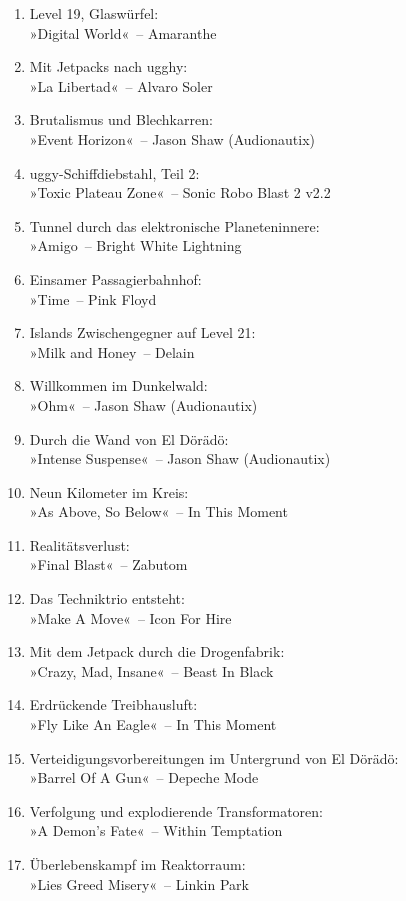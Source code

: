 \begin{enumerate}
    \item Level 19, Glaswürfel:\\ »Digital World«~– Amaranthe
    \item Mit Jetpacks nach ugghy:\\ »La Libertad«~– Alvaro Soler
    \item Brutalismus und Blechkarren:\\ »Event Horizon«~– Jason Shaw (Audionautix)
    \item uggy-Schiffdiebstahl, Teil 2:\\ »Toxic Plateau Zone«~– Sonic Robo Blast 2 v2.2
    \item Tunnel durch das elektronische Planeteninnere:\\ »Amigo~– Bright White Lightning
    \item Einsamer Passagierbahnhof:\\ »Time~– Pink Floyd
    \item Islands Zwischengegner auf Level 21:\\ »Milk and Honey~– Delain
    \item Willkommen im Dunkelwald:\\ »Ohm«~– Jason Shaw (Audionautix)
    \item Durch die Wand von El Dörädö:\\ »Intense Suspense«~– Jason Shaw (Audionautix)
    \item Neun Kilometer im Kreis:\\ »As Above, So Below«~– In This Moment
    \item Realitätsverlust:\\ »Final Blast«~– Zabutom
    \item Das Techniktrio entsteht:\\ »Make A Move«~– Icon For Hire
    \item Mit dem Jetpack durch die Drogenfabrik:\\ »Crazy, Mad, Insane«~– Beast In Black
    \item Erdrückende Treibhausluft:\\ »Fly Like An Eagle«~– In This Moment
    \item Verteidigungsvorbereitungen im Untergrund von El Dörädö:\\ »Barrel Of A Gun«~– Depeche Mode
    \item Verfolgung und explodierende Transformatoren:\\ »A Demon's Fate«~– Within Temptation
    \item Überlebenskampf im Reaktorraum:\\ »Lies Greed Misery«~– Linkin Park

\end{enumerate}
